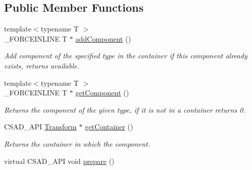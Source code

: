 \subsection*{Public Member Functions}
\begin{DoxyCompactItemize}
\item 
\hypertarget{classcsad_1_1_scene_component_aa80f5d0eeb1f01852db3c89dc65ba7d6}{{\footnotesize template$<$typename T $>$ }\\\-\_\-\-F\-O\-R\-C\-E\-I\-N\-L\-I\-N\-E T $\ast$ \hyperlink{classcsad_1_1_scene_component_aa80f5d0eeb1f01852db3c89dc65ba7d6}{add\-Component} ()}\label{classcsad_1_1_scene_component_aa80f5d0eeb1f01852db3c89dc65ba7d6}

\begin{DoxyCompactList}\small\item\em Add component of the specified type in the container if this component already exists, returns available. \end{DoxyCompactList}\item 
\hypertarget{classcsad_1_1_scene_component_a569b1faf246b9e9866ecab9d6c875988}{{\footnotesize template$<$typename T $>$ }\\\-\_\-\-F\-O\-R\-C\-E\-I\-N\-L\-I\-N\-E T $\ast$ \hyperlink{classcsad_1_1_scene_component_a569b1faf246b9e9866ecab9d6c875988}{get\-Component} ()}\label{classcsad_1_1_scene_component_a569b1faf246b9e9866ecab9d6c875988}

\begin{DoxyCompactList}\small\item\em Returns the component of the given type, if it is not in a container returns 0. \end{DoxyCompactList}\item 
\hypertarget{classcsad_1_1_scene_component_a5908ca4554e6f0796614ba97a71c4662}{C\-S\-A\-D\-\_\-\-A\-P\-I \hyperlink{classcsad_1_1_transform}{Transform} $\ast$ \hyperlink{classcsad_1_1_scene_component_a5908ca4554e6f0796614ba97a71c4662}{get\-Container} ()}\label{classcsad_1_1_scene_component_a5908ca4554e6f0796614ba97a71c4662}

\begin{DoxyCompactList}\small\item\em Returns the container in which the component. \end{DoxyCompactList}\item 
\hypertarget{classcsad_1_1_scene_component_a296e949901de8ba9cd84f88bb0d2629b}{virtual C\-S\-A\-D\-\_\-\-A\-P\-I void \hyperlink{classcsad_1_1_scene_component_a296e949901de8ba9cd84f88bb0d2629b}{prepare} ()}\label{classcsad_1_1_scene_component_a296e949901de8ba9cd84f88bb0d2629b}


\end{DoxyCompactItemize}
